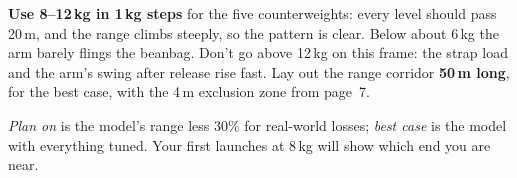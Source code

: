 \documentclass[11pt,a4paper]{article}
\begin{document}
\textbf{Use 8--12\,kg in 1\,kg steps} for the five counterweights: every level should pass 20\,m, and the range climbs steeply, so the pattern is clear. Below about 6\,kg the arm barely flings the beanbag. Don't go above 12\,kg on this frame: the strap load and the arm's swing after release rise fast. Lay out the range corridor \textbf{50\,m long}, for the best case, with the 4\,m exclusion zone from page~7.

\textit{Plan on} is the model's range less 30\% for real-world losses; \textit{best case} is the model with everything tuned. Your first launches at 8\,kg will show which end you are near.
\end{document}
